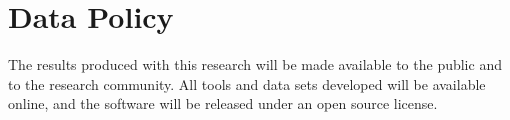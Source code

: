 \documentclass[11pt]{article}
\newcommand{\MAB}[1]{\textbf{[[}{\color{darkgreen} #1}\textbf{]]}}
\begin{document}

\section{Data Policy}

The results produced with this research will be made available to the
public and to the research community.  All tools and data sets
developed will be available online, and the software will be released
under an open source license.


\footnotesize


\end{document}
